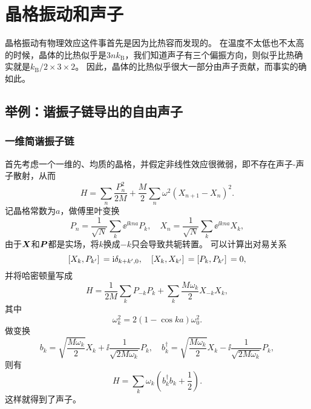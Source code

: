 \section{晶格振动和声子}\label{sec:phonon}

晶格振动有物理效应这件事首先是因为比热容而发现的。
在温度不太低也不太高的时候，晶体的比热似乎是$3 n k_\text{B}$，我们知道声子有三个偏振方向，则似乎比热确实就是$k_\text{B}/2 \times 3 \times 2$。
因此，晶体的比热似乎很大一部分由声子贡献，而事实的确如此。

\subsection{举例：谐振子链导出的自由声子}

\subsubsection{一维简谐振子链}

首先考虑一个一维的、均质的晶格，并假定非线性效应很微弱，即不存在声子-声子散射，从而
\begin{equation}
    {H} = \sum_n \frac{{P}_n^2}{2 M} + \frac{M}{2} \sum_{n} \omega^2 ({X}_{n+1} - {X}_{n})^2.
    \label{eq:one-dim-osc-hamiltonian}
\end{equation}
记晶格常数为$a$，做傅里叶变换
\[
    {P}_n = \frac{1}{\sqrt{N}} \sum_{k} \ee^{\ii k n a} {P}_k, \quad {X}_n = \frac{1}{\sqrt{N}} \sum_{k} \ee^{\ii k n a} {X}_k,
\]
由于$\vb*{X}$和$\vb*{P}$都是实场，将$k$换成$-k$只会导致共轭转置。
可以计算出对易关系
\begin{equation}
    \comm*{{X}_{k}}{{P}_{k'}} = \ii \delta_{k+k', 0}, \quad \comm*{{X}_{k}}{{X}_{k'}} = \comm*{{P}_{k}}{{P}_{k'}} = 0,
\end{equation}
并将哈密顿量写成
\[
    {H} = \frac{1}{2M} \sum_{k} {P}_{-k} {P}_{k} + \sum_k \frac{M \omega_{k}}{2} {X}_{-k} {X}_k,
\]
其中
\begin{equation}
    \omega_k^2 = 2 (1 - \cos k a) \omega_0^2.
\end{equation}
做变换
\begin{equation}
    {b}_{k} = \sqrt{\frac{M \omega_k}{2}} {X}_k + \ii \frac{1}{\sqrt{2 M \omega_k}} P_k, \quad {b}^\dagger_{k} = \sqrt{\frac{M \omega_k}{2}} {X}_k - \ii \frac{1}{\sqrt{2 M \omega_k}} P_k,
\end{equation}
则有
\begin{equation}
    {H} = \sum_k \omega_k \left({b}^\dagger_k {b}_k + \frac{1}{2}\right).
\end{equation}
这样就得到了声子。

